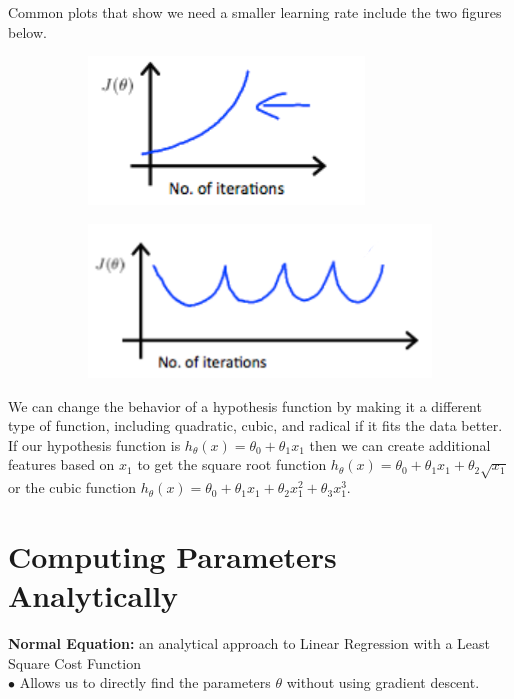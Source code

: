 \documentclass{article}
\begin{document}
        \noindent Common plots that show we need a smaller learning rate include the two figures below.

        \begin{figure}[hbt!]
            \centering
            \begin{subfigure}[b]{.45\linewidth}
                \includegraphics[scale=1]{Resources/Gradient_Descent_Debug}
            \end{subfigure}
            \begin{subfigure}[b]{.45\linewidth}
                \includegraphics[scale=0.8]{Resources/Gradient_Descent_Debug2}
            \end{subfigure}
        \end{figure}

        \noindent We can change the behavior of a hypothesis function by making it a different type of
        function, including quadratic, cubic, and radical if it fits the data better. If our hypothesis
        function is $h_\theta (x)=\theta_0+\theta_1 x_1$ then we can create additional features based on $x_1$
        to get the square root function $h_\theta(x)=\theta_0 +\theta_1 x_1+\theta_2\sqrt{x_1}$ or the cubic
        function $h_\theta(x)=\theta_0 + \theta_1 x_1 + \theta_2 x_1^2 + \theta_3 x_1^3$.



    \pagebreak
    \section{Computing Parameters Analytically}
        \textbf{Normal Equation:} an analytical approach to Linear Regression with a Least Square Cost Function \\
        $\bullet$ Allows us to directly find the parameters $\theta$ without using gradient descent. \\
\end{document}
